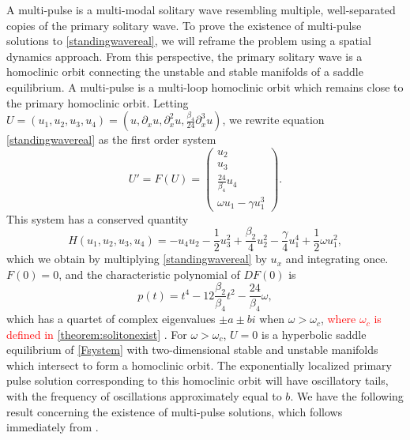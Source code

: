 \documentclass[12pt]{elsarticle}
\newcommand{\revised}[1]{ \textcolor{red}{#1} }
\begin{document}
A multi-pulse is a multi-modal solitary wave resembling multiple, well-separated copies of the primary solitary wave. To prove the existence of multi-pulse solutions to \cref{standingwavereal}, we will reframe the problem using a spatial dynamics approach. From this perspective, the primary solitary wave is a homoclinic orbit connecting the unstable and stable manifolds of a saddle equilibrium. A multi-pulse is a multi-loop homoclinic orbit which remains close to the primary homoclinic orbit. Letting $U = (u_1, u_2, u_3, u_4) = (u, \partial_x u, \partial_x^2 u, \frac{\beta_4}{24} \partial_x^3 u)$, we rewrite equation \cref{standingwavereal} as the first order system
\begin{equation}\label{Fsystem}
U' = F(U) = \begin{pmatrix}
u_2 \\ u_3 \\ \frac{24}{\beta_4} u_4 \\ \omega u_1 - \gamma u_1^3
\end{pmatrix}.
\end{equation}
This system has a conserved quantity
\begin{equation}\label{FsystemH}
H(u_1, u_2, u_3, u_4) = -u_4 u_2 - \frac{1}{2} u_3^2 + \frac{\beta_2}{4}u_2^2 - \frac{\gamma}{4} u_1^4 + \frac{1}{2}\omega u_1^2,
\end{equation}
which we obtain by multiplying \cref{standingwavereal} by $u_x$ and integrating once. $F(0) = 0$, and the characteristic polynomial of $DF(0)$ is
\[
p(t) = t^4 - 12\frac{\beta_2}{\beta_4} t^2 - \frac{24}{\beta_4}\omega,
\]
which has a quartet of complex eigenvalues $\pm a \pm b i$ when $\omega > \omega_c$, \revised{where $\omega_c$ is defined in \cref{theorem:solitonexist}}. For $\omega > \omega_c$, $U = 0$ is a hyperbolic saddle equilibrium of \cref{Fsystem} with two-dimensional stable and unstable manifolds which intersect to form a homoclinic orbit. The exponentially localized primary pulse solution corresponding to this homoclinic orbit will have oscillatory tails, with the frequency of oscillations approximately equal to $b$. We have the following result concerning the existence of multi-pulse solutions, which follows immediately from \cite[Theorem~3.6]{SandstedeStrut}. 
\end{document}
